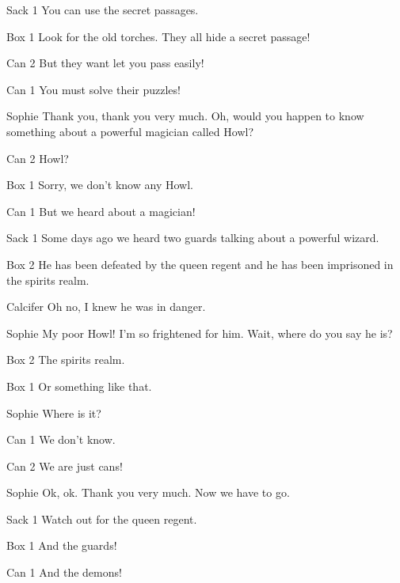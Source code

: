 \begin{screenplay}
\begin{dialogue}{Sack 1}
You can use the secret passages.
\end{dialogue}
\begin{dialogue}{Box 1}
Look for the old torches. They all hide a secret passage!
\end{dialogue}
\begin{dialogue}{Can 2}
But they want let you pass easily!
\end{dialogue}
\begin{dialogue}{Can 1}
You must solve their puzzles!
\end{dialogue}
\begin{dialogue}[grateful]{Sophie}
Thank you, thank you very much. Oh, would you happen to know something about a powerful magician called Howl?
\end{dialogue}
\begin{dialogue}{Can 2}
Howl?
\end{dialogue}
\begin{dialogue}{Box 1}
Sorry, we don’t know any Howl.
\end{dialogue}
\begin{dialogue}{Can 1}
But we heard about a magician!
\end{dialogue}
\begin{dialogue}{Sack 1}
Some days ago we heard two guards talking about a powerful wizard.
\end{dialogue}
\begin{dialogue}{Box 2}
He has been defeated by the queen regent and he has been imprisoned in the spirits realm.
\end{dialogue}
\begin{dialogue}{Calcifer}
Oh no, I knew he was in danger.
\end{dialogue}
\begin{dialogue}{Sophie}
My poor Howl! I’m so frightened for him. Wait, where do you say he is?
\end{dialogue}
\begin{dialogue}{Box 2}
The spirits realm.
\end{dialogue}
\begin{dialogue}{Box 1}
Or something like that.
\end{dialogue}
\begin{dialogue}{Sophie}
Where is it?
\end{dialogue}
\begin{dialogue}{Can 1}
We don’t know.
\end{dialogue}
\begin{dialogue}{Can 2}
We are just cans!
\end{dialogue}
\begin{dialogue}{Sophie}
Ok, ok. Thank you very much. Now we have to go.
\end{dialogue}
\begin{dialogue}{Sack 1}
Watch out for the queen regent.
\end{dialogue}
\begin{dialogue}{Box 1}
And the guards!
\end{dialogue}
\begin{dialogue}{Can 1}
And the demons!
\end{dialogue}
\end{screenplay}

